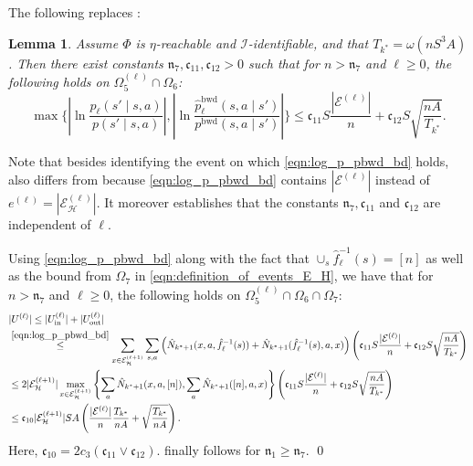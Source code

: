 \documentclass[11pt]{article}
\newcommand{\mf}[1]{\mathfrak{#1}}
\newcommand{\mcE}{\mathcal{E}}
\newcommand{\mcH}{\mathcal{H}}
\newcommand{\mcI}{\mathcal{I}}
\newcommand{\lb}{\left(}
\newcommand{\rb}{\right)}
\newtheorem{lemma}[theorem]{Lemma}
\theoremstyle{definition}
\theoremstyle{definition}
\begin{document}
The following replaces \cite[Lemma 25]{Jedra:2022}:
\begin{lemma}
	\label{lem:logtransprobratiosbd}
	Assume $\Phi$ is $\eta$-reachable and $\mcI$-identifiable, and that $T_{k^*}=\omega(nS^3A)$.
	Then there exist constants $\mf{n}_7,\mf{c}_{11},\mf{c}_{12}>0$ such that for $n>\mf{n}_7$ and $\ell\geq 0$, the following holds on $\Omega_5^{(\ell)}\cap\Omega_6$:
	\begin{equation}
		\label{eqn:log_p_pbwd_bd}
		\max
		\biggl\{ \left|\ln \frac{\hat{p}_{\ell}(s'\mid s,a)}{p(s'\mid s,a)}\right|, \left|\ln \frac{\hat{p}^{\mathrm{bwd}}_{\ell}(s,a\mid s')}{p^{\mathrm{bwd}}(s,a\mid s')}\right|\biggr\}
		\leq
		\mf{c}_{11}S\frac{|\mcE^{(\ell)}|}{n}
		+
		\mf{c}_{12}S\sqrt{\frac{nA}{T_{k^*}}}
		.
	\end{equation}
\end{lemma}
Note that besides identifying the event on which \eqref{eqn:log_p_pbwd_bd} holds,  also differs from \cite[Lemma 25]{Jedra:2022} because \eqref{eqn:log_p_pbwd_bd} contains $|\mcE^{(\ell)}|$ instead of $e^{(\ell)}=|\mcE^{(\ell)}_{\mcH}|$.
It moreover establishes that the constants $\mf{n}_7,\mf{c}_{11}$ and $\mf{c}_{12}$ are independent of $\ell$.

Using \eqref{eqn:log_p_pbwd_bd} along with the fact that $\cup_{s}\hat{f}_{\ell}^{-1}(s)=[n]$ as well as the bound from $\Omega_7$ in \eqref{eqn:definition_of_events_E_H}, we have that for $n>\mf{n}_7$ and $\ell\geq 0$, the following holds on $\Omega_5^{(\ell)}\cap\Omega_6\cap \Omega_7$:
\begin{align}
	 &
	|U^{(\ell)}|\leq |U^{(\ell)}_{\mathrm{in}}|+|U^{(\ell)}_{\mathrm{out}}|
	\nonumber
	\\
	 &
	\overset{\eqref{eqn:log_p_pbwd_bd}}{\leq}
	\sum_{x\in\mcE_{\mcH}^{(\ell+1)}}
	\sum_{s,a}
	\lb \hat{N}_{k^*+1}(x,a,\hat{f}_{\ell}^{-1}(s))+\hat{N}_{k^*+1}(\hat{f}_{\ell}^{-1}(s),a,x)\rb
	\lb
	\mf{c}_{11}S\frac{|\mcE^{(\ell)}|}{n}
	+
	\mf{c}_{12}S\sqrt{\frac{nA}{T_{k^*}}}
	\rb
	\nonumber
	\\
	 &
	\leq
	2 |\mcE_{\mcH}^{(\ell+1)}|\max_{x\in\mcE_{\mcH}^{(\ell+1)}}
	\left\{
	\sum_{a}\hat{N}_{k^*+1}(x,a,[n]),\sum_{a}\hat{N}_{k^*+1}([n],a,x)
	\right\}
	\lb
	\mf{c}_{11}S\frac{|\mcE^{(\ell)}|}{n}
	+
	\mf{c}_{12}S\sqrt{\frac{nA}{T_{k^*}}}
	\rb
	\nonumber
	\\
	 &
	\leq
	\mf{c}_{10} |\mcE_{\mcH}^{(\ell+1)}|SA
	\lb
	\frac{|\mcE^{(\ell)}|}{n}
	\frac{T_{k^*}}{nA}
	+
	\sqrt{\frac{T_{k^*}}{nA}}
	\rb
	.
\end{align}
Here, $\mf{c}_{10}=2c_3(\mf{c}_{11}\vee \mf{c}_{12})$.
 finally follows for $\mf{n}_1 \geq \mf{n}_7$.
\qed
\end{document}
